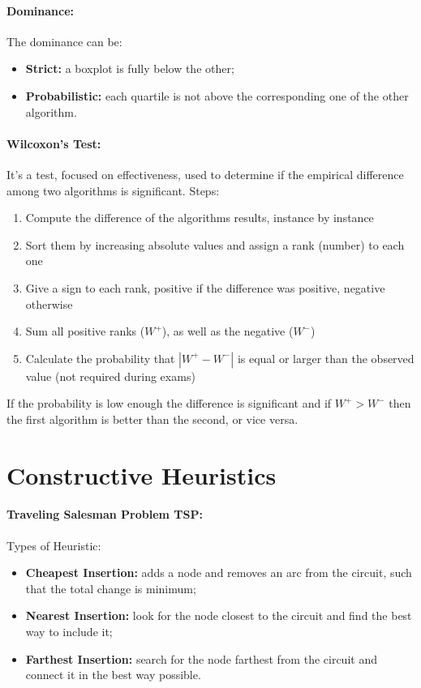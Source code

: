 \documentclass{article}
\begin{document}
	\paragraph{Dominance:} The dominance can be: 
	\begin{itemize}
		\item \textbf{Strict:} a boxplot is fully below the other;
		\item \textbf{Probabilistic:} each quartile is not above the corresponding one of the other algorithm.\\
	\end{itemize}
	
	\paragraph{Wilcoxon's Test:} It's a test, focused on effectiveness, used to determine if the empirical difference among two algorithms is significant. Steps:
	\begin{enumerate}
		\item Compute the difference of the algorithms results, instance by instance
		\item Sort them by increasing absolute values and assign a rank (number) to each one
		\item Give a sign to each rank, positive if the difference was positive, negative otherwise
		\item Sum all positive ranks ($W^+$), as well as the negative ($W^-$)
		\item Calculate the probability that $|W^+ - W^-|$ is equal or larger than the observed value (not required during exams)
	\end{enumerate}
	If the probability is low enough the difference is significant and if $W^+ > W^-$ then the first algorithm is better than the second, or vice versa.\\
	
	\section*{Constructive Heuristics}
	
	\paragraph{Traveling Salesman Problem TSP:} Types of Heuristic: 
	\begin{itemize}
		\item \textbf{Cheapest Insertion:} adds a node and removes an arc from the circuit, such that the total change is minimum;
		\item \textbf{Nearest Insertion:} look for the node closest to the circuit and find the best way to include it;
		\item \textbf{Farthest Insertion:} search for the node farthest from the circuit and connect it in the best way possible.\\
	\end{itemize}
	
\end{document}
